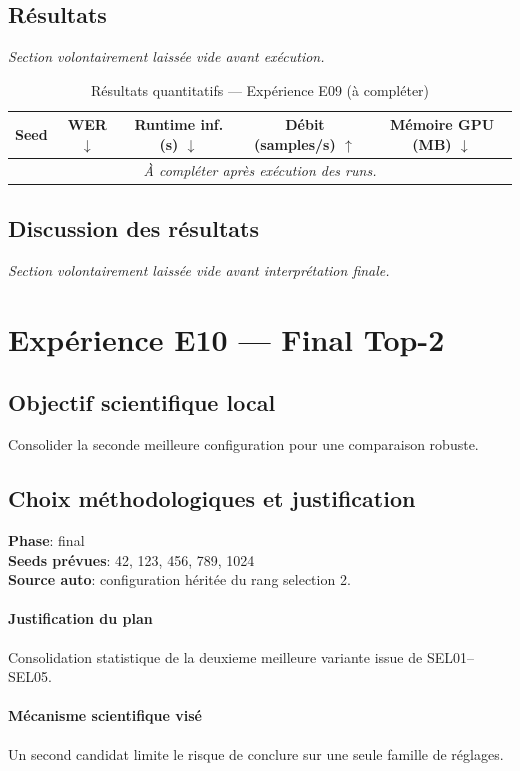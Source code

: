 \documentclass[11pt,a4paper]{article}
\begin{document}
\subsection{Résultats}
\textit{Section volontairement laissée vide avant exécution.}

\begin{table}[H]
\centering
\caption{Résultats quantitatifs --- Expérience E09 (à compléter)}
\begin{tabular}{lcccc}
\toprule
Seed & WER $\downarrow$ & Runtime inf. (s) $\downarrow$ & Débit (samples/s) $\uparrow$ & Mémoire GPU (MB) $\downarrow$ \\
\midrule
\multicolumn{5}{c}{\textit{À compléter après exécution des runs.}} \\
\bottomrule
\end{tabular}
\end{table}

\subsection{Discussion des résultats}
\textit{Section volontairement laissée vide avant interprétation finale.}


\section{Expérience E10 --- Final Top-2}
\subsection{Objectif scientifique local}
Consolider la seconde meilleure configuration pour une comparaison robuste.

\subsection{Choix méthodologiques et justification}
\textbf{Phase}: final\\
\textbf{Seeds prévues}: 42, 123, 456, 789, 1024\\
\textbf{Source auto}: configuration héritée du rang selection 2.

\paragraph{Justification du plan}
Consolidation statistique de la deuxieme meilleure variante issue de SEL01--SEL05.

\paragraph{Mécanisme scientifique visé}
Un second candidat limite le risque de conclure sur une seule famille de réglages.
\end{document}
